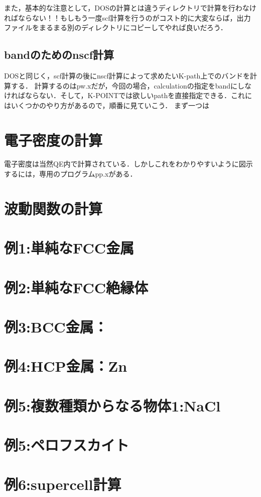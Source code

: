 \documentclass[a4j]{jarticle}
\begin{document}
 また，基本的な注意として，DOSの計算とは違うディレクトリで計算を行わなければならない！！もしもう一度scf計算を行うのがコスト的に大変ならば，出力ファイルをまるまる別のディレクトリにコピーしてやれば良いだろう．
 
 \subsection{bandのためのnscf計算}
 DOSと同じく，scf計算の後にnscf計算によって求めたいK-path上でのバンドを計算する．
 計算するのはpw.xだが，今回の場合，calculationの指定をbandにしなければならない．そして，K-POINTでは欲しいpathを直接指定できる．これにはいくつかのやり方があるので，順番に見ていこう．
 まず一つは

 \section{電子密度の計算}

 電子密度は当然QE内で計算されている．しかしこれをわかりやすいように図示するには，専用のプログラムpp.xがある．
 
 \section{波動関数の計算}
 
 
 \section{例1:単純なFCC金属}
 \section{例2:単純なFCC絶縁体}
 \section{例3:BCC金属：}
 \section{例4:HCP金属：Zn}
 \section{例5:複数種類からなる物体1:NaCl}
 \section{例5:ペロフスカイト}
 \section{例6:supercell計算}
 
 


 
  
  
\end{document}
